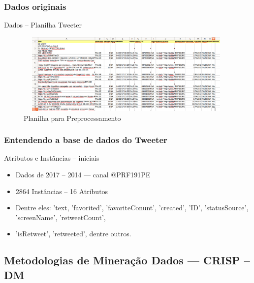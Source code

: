 \documentclass[11pt]{beamer}
\begin{document}
\begin{frame}\frametitle{ Dados originais}
	\transblindsvertical[duration=2, direction=25]
	\begin{block}{ Dados -- Planilha Tweeter}
		\begin{figure}[!ht]
			\centering %
			\caption{Planilha para Preprocessamento}
			\includegraphics[width=110mm, height=40mm]{Figuras/BigData/tweetPRF.png}
		\end{figure}
	\end{block}
\end{frame}

\begin{frame}\frametitle{ Entendendo a base de dados do Tweeter}
	\begin{exampleblock}{Atributos e Instâncias -- iniciais}
		\begin{itemize}
			\item Dados de 2017 -- 2014 --- canal @PRF191PE
			\pause
			\item 2864 Instâncias -- 16 Atributos
			\pause
			\item Dentre eles: 'text, 'favorited', 'favoriteConunt', 'created', 'ID', 'statusSource', 'screenName', 'retweetCount',
			\pause
			\item 'isRetweet', 'retweeted', dentre outros.		
		\end{itemize}
	\end{exampleblock}
\end{frame}


\subsection{ Metodologias de Mineração Dados --- CRISP -- DM}
\end{document}
